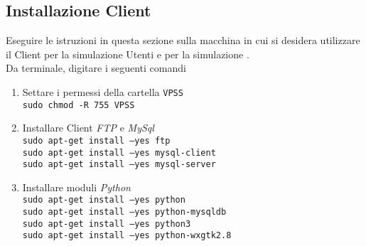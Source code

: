 \documentclass[a4paper,twoside,10pt,openany]{scrbook}
\begin{document}
\subsection{Installazione Client}\label{sec:installazione_client_ubu}
Eseguire le istruzioni in questa sezione sulla macchina in cui si desidera utilizzare il Client per la simulazione Utenti e per la simulazione \auth.\\
Da terminale, digitare i seguenti comandi
\begin{enumerate}
 \item Settare i permessi della cartella \texttt{VPSS}\\
       \texttt{sudo chmod -R 755 VPSS}
%
% 
 \item Installare Client \emph{FTP} e \emph{MySql}\\
       \texttt{sudo apt-get install --yes ftp}\\
       \texttt{sudo apt-get install --yes mysql-client}\\
       \texttt{sudo apt-get install --yes mysql-server}\\
% 
% 
\item Installare moduli \emph{Python}\\
      \texttt{sudo apt-get install --yes python}\\
      \texttt{sudo apt-get install --yes python-mysqldb}\\
      \texttt{sudo apt-get install --yes python3}\\
      \texttt{sudo apt-get install --yes python-wxgtk2.8}\\
 

\end{enumerate}
\end{document}
